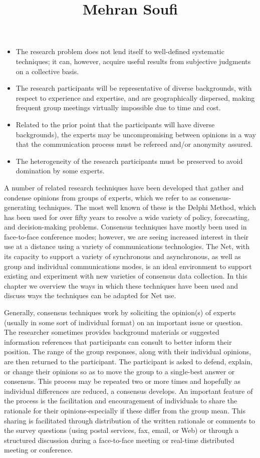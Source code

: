 \documentclass [8pt]{beamer}
\title{Mehran Soufi}
\author{}
\date{}
\begin{document}
\small
\begin{frame}
\justifying	
 \begin{itemize}
	\item 
	The research problem does not lend itself to well-defined systematic techniques; it can, however, acquire useful results from subjective judgments on a collective basis. 
	\item
	The research participants will be representative of diverse backgrounds, with respect to experience and expertise, and are geographically dispersed, making frequent group meetings virtually impossible due to time and cost.
	\item
	Related to the prior point that the participants will have diverse backgrounds), the experts may be uncompromising between opinions in a way that the communication process must be refereed and/or anonymity assured. 
	\item
	The heterogeneity of the research participants must be preserved to avoid domination by some experts.
\end{itemize}



A number of related research techniques have been developed that gather and condense opinions from groups of experts, which we refer to as consensus-generating techniques. The most well known of these is the Delphi Method, which has been used for over fifty years to resolve a wide variety of policy, forecasting, and decision-making problems. Consensus techniques have mostly been used in face-to-face conference modes; however, we are seeing increased interest in their use at a distance using a variety of communications technologies. The Net, with its capacity to support a variety of synchronous and asynchronous, as well as group and individual communications modes, is an ideal environment to support existing and experiment with new varieties of consensus data collection. In this chapter we overview the ways in which these techniques have been used and discuss ways the techniques can be adapted for Net use.

Generally, consensus techniques work by soliciting the opinion(s) of experts (usually in some sort of individual format) on an important issue or question. The researcher sometimes provides background materials or suggested information references that participants can consult to better inform their position. The range of the group responses, along with their individual opinions, are then returned to the participant. The participant is asked to defend, explain, or change their opinions so as to move the group to a single-best answer or consensus. This process may be repeated two or more times and hopefully as individual differences are reduced, a consensus develops. An important feature of the process is the facilitation and encouragement of individuals to share the rationale for their opinions-especially if these differ from the group mean. This sharing is facilitated through distribution of the written rationale or comments to the survey questions (using postal services, fax, email, or Web) or through a structured discussion during a face-to-face meeting or real-time distributed meeting or conference.
\end{frame}
\end{document}
